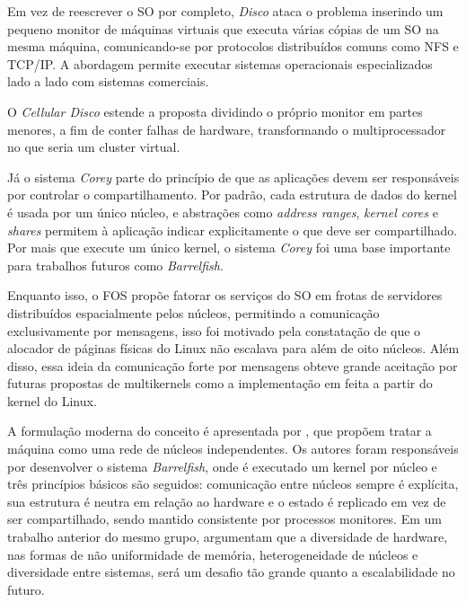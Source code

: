 Em vez de reescrever o SO por completo, \textit{Disco} \citep{bugnion1997disco} ataca o problema inserindo um pequeno monitor de máquinas virtuais
que executa várias cópias de um SO na mesma máquina, comunicando-se por protocolos distribuídos comuns
como NFS e TCP/IP.
A abordagem permite executar sistemas operacionais especializados lado a lado com sistemas comerciais.

O \textit{Cellular Disco} \citep{govil2000cellular} estende a proposta dividindo o próprio monitor em partes menores, a fim de conter falhas
de hardware, transformando o multiprocessador no que seria um cluster virtual.

Já o sistema \textit{Corey} \citep{boydwickizer2008corey} parte do princípio de que as aplicações devem ser responsáveis por controlar o compartilhamento.
Por padrão, cada estrutura de dados do kernel é usada por um único núcleo, e abstrações como \textit{address ranges}, \textit{kernel cores}
e \textit{shares} permitem à aplicação indicar explicitamente o que deve ser compartilhado.
Por mais que execute um único kernel, o sistema \textit{Corey} foi uma base importante para trabalhos futuros como \textit{Barrelfish}.

Enquanto isso, o FOS \citep{wentzlaff2009fos} propõe fatorar os serviços do SO em frotas de servidores distribuídos
espacialmente pelos núcleos, permitindo a comunicação exclusivamente por mensagens, isso foi motivado pela constatação de que
o alocador de páginas físicas do Linux não escalava para além de oito núcleos.
Além disso, essa ideia da comunicação forte por mensagens obteve grande aceitação por futuras propostas de multikernels como
a implementação em \citet{wang2025multikernel} feita a partir do kernel do Linux.

A formulação moderna do conceito é apresentada por \citet{baumann2009multikernel}, que propõem tratar a máquina como uma
rede de núcleos independentes.
Os autores foram responsáveis por desenvolver o sistema \textit{Barrelfish}, onde é executado um kernel por núcleo e três princípios básicos são seguidos: comunicação entre núcleos sempre é
explícita, sua estrutura é neutra em relação ao hardware e o estado é replicado em vez de ser compartilhado, sendo mantido consistente por processos monitores.
Em um trabalho anterior do mesmo grupo, \citet{schupbach2008diversity} argumentam que a diversidade de hardware, nas formas de não
uniformidade de memória, heterogeneidade de núcleos e diversidade entre sistemas, será um desafio tão grande quanto a escalabilidade no futuro.

